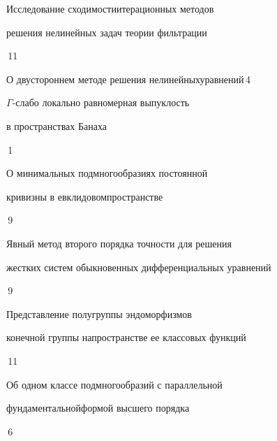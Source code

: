 





{Исследование сходимости\newline итерационных методов 


решения нелинейных задач теории фильтрации}{\No\,11}




{О двустороннем методе решения нелинейных\newline уравнений}{\No\,4}




{$\Gamma$-слабо локально равномерная выпуклость  


в пространствах Банаха}{\No\,1}




{О минимальных подмногообразиях постоянной 


кривизны в евклидовом\newline пространстве}{\No\,9}




{Явный метод второго порядка точности для решения\newline


жестких систем обыкновенных дифференциальных уравнений}{\No\,9}




{Представление полугруппы эндоморфизмов 


конечной группы на\newline пространстве ее классовых функций}{\No\,11}




{Об одном классе подмногообразий с параллельной


фундаментальной\newline формой высшего порядка}{\No\,6}




